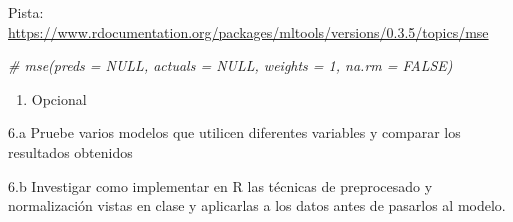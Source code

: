\documentclass[]{article}
\newenvironment{Shaded}{\begin{snugshade}}{\end{snugshade}}
\newcommand{\CommentTok}[1]{\textcolor[rgb]{0.56,0.35,0.01}{\textit{#1}}}
\providecommand{\tightlist}{%
  \setlength{\itemsep}{0pt}\setlength{\parskip}{0pt}}
\begin{document}
Pista:
\url{https://www.rdocumentation.org/packages/mltools/versions/0.3.5/topics/mse}

\begin{Shaded}
\begin{Highlighting}[]
\CommentTok{# mse(preds = NULL, actuals = NULL, weights = 1, na.rm = FALSE)}
\end{Highlighting}
\end{Shaded}

\begin{enumerate}
\def\labelenumi{\arabic{enumi}.}
\setcounter{enumi}{5}
\tightlist
\item
  Opcional
\end{enumerate}

6.a Pruebe varios modelos que utilicen diferentes variables y comparar
los resultados obtenidos

6.b Investigar como implementar en R las técnicas de preprocesado y
normalización vistas en clase y aplicarlas a los datos antes de pasarlos
al modelo.
\end{document}
